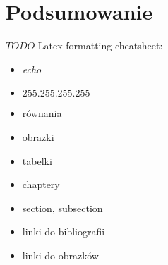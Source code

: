 \chapter{Podsumowanie} %
\label{cha:podsumowanie}

$TODO$
Latex formatting cheatsheet:
\begin{itemize}
	\item \textit{echo}
	\item $ 255.255.255.255 $
	\item równania
	\item obrazki
	\item tabelki
	\item chaptery
	\item section, subsection
	\item linki do bibliografii
	\item linki do obrazków
\end{itemize}
